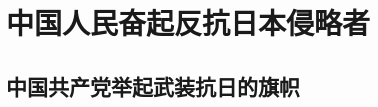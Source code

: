 \documentclass[10pt, UTF8]{ctexbook} %
\begin{document}
\section{中国人民奋起反抗日本侵略者}

\subsection{中国共产党举起武装抗日的旗帜}








\end{document}
